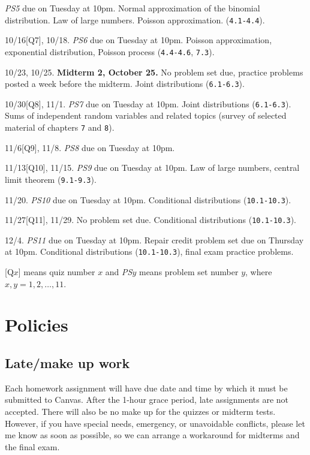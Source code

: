 \documentclass[oneside,11pt]{amsart}
\begin{document}
\begin{enumerate}[\bf{}{[}week 1{]}]
		\emph{PS5} due on Tuesday at 10pm.
		Normal approximation of the binomial distribution. Law of large numbers.
		Poisson approximation.
		(\texttt{4.1-4.4}).
	\item 10/16[Q7], 10/18. 
		\emph{PS6} due on Tuesday at 10pm.
		Poisson approximation, exponential distribution, Poisson process
		(\texttt{4.4-4.6}, \texttt{7.3}).
	\item 10/23, 10/25. \textbf{Midterm 2, October 25.}
		No problem set due, practice problems posted a week before the midterm.
		Joint distributions (\texttt{6.1-6.3}).
	\item 10/30[Q8], 11/1.
		\emph{PS7} due on Tuesday at 10pm.
		Joint distributions (\texttt{6.1-6.3}).
		Sums of independent random variables and related topics (survey of 
		selected material of chapters \texttt{7} and \texttt{8}).
	\item 11/6[Q9], 11/8.
		\emph{PS8} due on Tuesday at 10pm.
	\item 11/13[Q10], 11/15.
		\emph{PS9} due on Tuesday at 10pm.
		Law of large numbers, central limit theorem (\texttt{9.1-9.3}).
	\item 11/20.
		\emph{PS10} due on Tuesday at 10pm.
		Conditional distributions
		(\texttt{10.1-10.3}).
	\item 11/27[Q11], 11/29.
		No problem set due.
		Conditional distributions (\texttt{10.1-10.3}).
	\item 12/4.
		\emph{PS11} due on Tuesday at 10pm.
		Repair credit problem set due on Thursday at 10pm.
		Conditional distributions (\texttt{10.1-10.3}),
		final exam practice problems.
\end{enumerate}

\bigskip

[Q$x$] means quiz number $x$ and \emph{PS$y$} means problem set number $y$, where $x,y=1,2,\dots,11$.

\section{Policies}

\subsection{Late/make up work} Each homework
assignment will have due date and time by which it must be submitted to Canvas.
After the 1-hour grace period, late assignments are not accepted.
There will also be no make up for the quizzes or midterm tests.
However, if you have special needs, emergency, or unavoidable conflicts, please
let me know as soon as possible, so we can arrange a workaround for midterms and the final exam.
\end{document}
